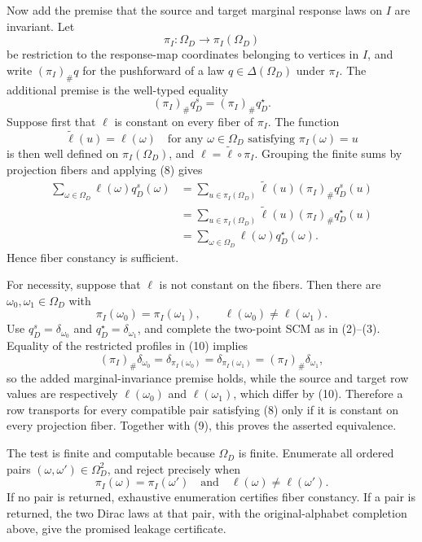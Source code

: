 Now add the premise that the source and target marginal response laws on \(I\) are invariant.  Let
\[
\pi_I:\Omega_D\longrightarrow\pi_I(\Omega_D)
\]
be restriction to the response-map coordinates belonging to vertices in \(I\), and write \((\pi_I)_{\#}q\) for the pushforward of a law \(q\in\Delta(\Omega_D)\) under \(\pi_I\).  The additional premise is the well-typed equality
\[
(\pi_I)_{\#}q_D^s=(\pi_I)_{\#}q_D^\star.
\tag{8}
\]
Suppose first that \(\ell\) is constant on every fiber of \(\pi_I\).  The function
\[
\widetilde\ell(u)=\ell(\omega)
\quad\text{for any }\omega\in\Omega_D\text{ satisfying }\pi_I(\omega)=u
\]
is then well defined on \(\pi_I(\Omega_D)\), and \(\ell=\widetilde\ell\circ\pi_I\).  Grouping the finite sums by projection fibers and applying (8) gives
\[
\begin{aligned}
\sum_{\omega\in\Omega_D}\ell(\omega)q_D^s(\omega)
&=\sum_{u\in\pi_I(\Omega_D)}
  \widetilde\ell(u)(\pi_I)_{\#}q_D^s(u)\\
&=\sum_{u\in\pi_I(\Omega_D)}
  \widetilde\ell(u)(\pi_I)_{\#}q_D^\star(u)\\
&=\sum_{\omega\in\Omega_D}\ell(\omega)q_D^\star(\omega).
\end{aligned}
\tag{9}
\]
Hence fiber constancy is sufficient.

For necessity, suppose that \(\ell\) is not constant on the fibers.  Then there are \(\omega_0,\omega_1\in\Omega_D\) with
\[
\pi_I(\omega_0)=\pi_I(\omega_1),
\qquad
\ell(\omega_0)\ne\ell(\omega_1).
\tag{10}
\]
Use \(q_D^s=\delta_{\omega_0}\) and \(q_D^\star=\delta_{\omega_1}\), and complete the two-point SCM as in (2)--(3).  Equality of the restricted profiles in (10) implies
\[
(\pi_I)_{\#}\delta_{\omega_0}
=\delta_{\pi_I(\omega_0)}
=\delta_{\pi_I(\omega_1)}
=(\pi_I)_{\#}\delta_{\omega_1},
\tag{11}
\]
so the added marginal-invariance premise holds, while the source and target row values are respectively \(\ell(\omega_0)\) and \(\ell(\omega_1)\), which differ by (10).  Therefore a row transports for every compatible pair satisfying (8) only if it is constant on every projection fiber.  Together with (9), this proves the asserted equivalence.

The test is finite and computable because \(\Omega_D\) is finite.  Enumerate all ordered pairs \((\omega,\omega')\in\Omega_D^2\), and reject precisely when
\[
\pi_I(\omega)=\pi_I(\omega')
\quad\text{and}\quad
\ell(\omega)\ne\ell(\omega').
\tag{12}
\]
If no pair is returned, exhaustive enumeration certifies fiber constancy.  If a pair is returned, the two Dirac laws at that pair, with the original-alphabet completion above, give the promised leakage certificate.


